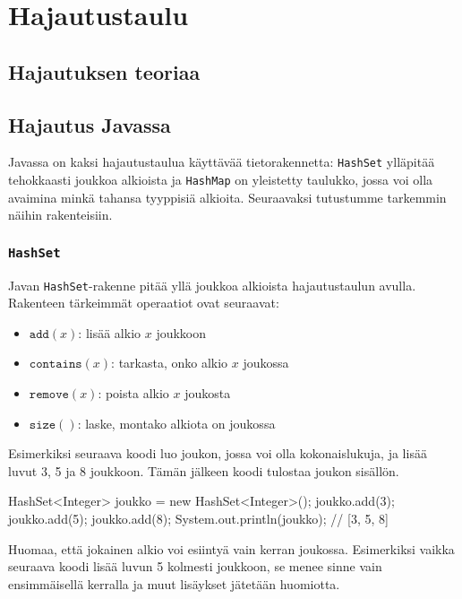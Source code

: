 \chapter{Hajautustaulu}

\section{Hajautuksen teoriaa}

\section{Hajautus Javassa}

Javassa on kaksi hajautustaulua käyttävää tietorakennetta:
\texttt{HashSet} ylläpitää tehokkaasti joukkoa alkioista
ja \texttt{HashMap} on yleistetty taulukko,
jossa voi olla avaimina minkä tahansa tyyppisiä alkioita.
Seuraavaksi tutustumme tarkemmin näihin rakenteisiin.

\subsection{\texttt{HashSet}}

Javan \texttt{HashSet}-rakenne pitää yllä joukkoa alkioista
hajautustaulun avulla.
Rakenteen tärkeimmät operaatiot ovat seuraavat:

\begin{itemize}
\item $\texttt{add}(x)$: lisää alkio $x$ joukkoon
\item $\texttt{contains}(x)$: tarkasta, onko alkio $x$ joukossa
\item $\texttt{remove}(x)$: poista alkio $x$ joukosta
\item $\texttt{size}()$: laske, montako alkiota on joukossa
\end{itemize}

Esimerkiksi seuraava koodi luo joukon, jossa voi olla
kokonaislukuja, ja lisää luvut 3, 5 ja 8 joukkoon.
Tämän jälkeen koodi tulostaa joukon sisällön.

\begin{code}
HashSet<Integer> joukko = new HashSet<Integer>();
joukko.add(3);
joukko.add(5);
joukko.add(8);
System.out.println(joukko); // [3, 5, 8]
\end{code}

Huomaa, että jokainen alkio voi esiintyä vain kerran joukossa.
Esimerkiksi vaikka seuraava koodi lisää luvun 5 kolmesti
joukkoon, se menee sinne vain ensimmäisellä kerralla ja
muut lisäykset jätetään huomiotta.

